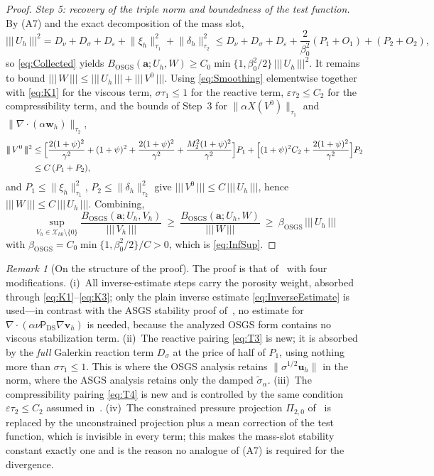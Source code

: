 \documentclass[11pt]{article}
\theoremstyle{remark}
\newtheorem{remark}[theorem]{Remark}
\newcommand{\bu}{\boldsymbol{u}}
\newcommand{\bv}{\boldsymbol{v}}
\newcommand{\bw}{\boldsymbol{w}}
\newcommand{\ba}{\boldsymbol{a}}
\newcommand{\ViscProj}{\mathsf{P}_{\mathrm{DS}}}
\newcommand{\norm}[1]{\lVert #1 \rVert}
\newcommand{\tnorm}[1]{\lvert\!\lvert\!\lvert\, #1 \,\rvert\!\rvert\!\rvert}
\newcommand{\Xhz}{\mathcal{X}_{h0}}
\begin{document}
\begin{proof}
\medskip\noindent\emph{Step 5: recovery of the triple norm and boundedness of the test
function.}
By \textup{(A7)} and the exact decomposition of the mass slot,
\[
  \tnorm{U_h}^2
  = D_\nu + D_\sigma + D_\varepsilon + \norm{\xi_h}_{\tau_1}^2 + \norm{\delta_h}_{\tau_2}^2
  \le D_\nu + D_\sigma + D_\varepsilon + \frac{2}{\beta_0^2}(P_1 + O_1) + (P_2 + O_2),
\]
so \cref{eq:Collected} yields
$B_{\mathrm{OSGS}}(\ba; U_h, W) \ge C_0 \min\{1, \beta_0^2/2\}\,\tnorm{U_h}^2$.
It remains to bound $\tnorm{W} \le \tnorm{U_h} + \tnorm{V^0}$. Using
\cref{eq:Smoothing} elementwise together with \cref{eq:K1} for the viscous term,
$\sigma\tau_1 \le 1$ for the reactive term, $\varepsilon\tau_2 \le C_2$ for the
compressibility term, and the bounds of Step~3 for
$\norm{\alpha X(V^0)}_{\tau_1}$ and $\norm{\nabla\cdot(\alpha\bw_h)}_{\tau_2}$,
\begin{align*}
  \tnorm{V^0}^2
  &\le \Bigl[ \frac{2(1+\psi)^2}{\gamma^2}
  + (1+\psi)^2
  + \frac{2(1+\psi)^2}{\gamma^2}
  + \frac{M_2^2(1+\psi)^2}{\gamma^2} \Bigr] P_1
  + \Bigl[ (1+\psi)^2 C_2 + \frac{2(1+\psi)^2}{\gamma^2} \Bigr] P_2\\
  &\le C\,(P_1 + P_2),
\end{align*}
and $P_1 \le \norm{\xi_h}_{\tau_1}^2$, $P_2 \le \norm{\delta_h}_{\tau_2}^2$ give
$\tnorm{V^0} \le C\,\tnorm{U_h}$, hence $\tnorm{W} \le C\,\tnorm{U_h}$. Combining,
\[
  \sup_{V_h\in\Xhz\setminus\{0\}} \frac{B_{\mathrm{OSGS}}(\ba; U_h, V_h)}{\tnorm{V_h}}
  \ \ge\ \frac{B_{\mathrm{OSGS}}(\ba; U_h, W)}{\tnorm{W}}
  \ \ge\ \beta_{\mathrm{OSGS}}\, \tnorm{U_h}
\]
with $\beta_{\mathrm{OSGS}} = C_0\min\{1,\beta_0^2/2\}/C > 0$, which is
\cref{eq:InfSup}.
\end{proof}

\begin{remark}[On the structure of the proof]
\label{rem:proofstructure}
The proof is that of~\cite[Theorem~1]{Codina2008} with four modifications. (i)~All
inverse-estimate steps carry the porosity weight, absorbed through
\cref{eq:K1}--\cref{eq:K3}; only the plain inverse estimate
\cref{eq:InverseEstimate} is used---in contrast with the ASGS stability proof
of~\cite{companion}, no estimate for $\nabla\cdot(\alpha\nu\ViscProj\nabla\bv_h)$ is
needed, because the analyzed OSGS form contains no viscous stabilization term.
(ii)~The reactive pairing \cref{eq:T3} is new; it is absorbed by the \emph{full}
Galerkin reaction term $D_\sigma$ at the price of half of $P_1$, using nothing more
than $\sigma\tau_1 \le 1$. This is where the OSGS analysis retains
$\norm{\sigma^{1/2}\bu_h}$ in the norm, where the ASGS analysis retains only the
damped $\widetilde{\sigma}_\alpha$. (iii)~The compressibility pairing \cref{eq:T4} is
new and is controlled by the same condition $\varepsilon\tau_2 \le C_2$ assumed
in~\cite{companion}. (iv)~The constrained pressure projection $\Pi_{2,0}$
of~\cite{Codina2008} is replaced by the unconstrained projection plus a mean
correction of the test function, which is invisible in every term; this makes the
mass-slot stability constant exactly one and is the reason no analogue of
\textup{(A7)} is required for the divergence.
\end{remark}
\end{document}
